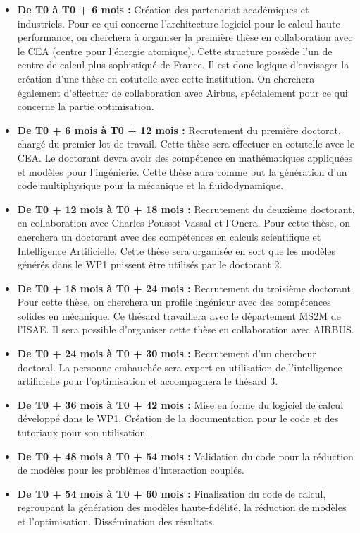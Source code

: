 \documentclass[12pt, french]{article}
\begin{document}
\begin{itemize}
	\item \textbf{De T0 à T0 + 6 mois :} Création des partenariat académiques et industriels.
	Pour ce qui concerne l'architecture logiciel pour le calcul haute performance, on cherchera à organiser la première thèse en collaboration avec le CEA (centre pour l'énergie atomique). Cette structure possède l'un de centre de calcul plus sophistiqué de France. Il est donc logique d'envisager la création d'une thèse en cotutelle avec cette institution. On cherchera également d'effectuer de collaboration avec Airbus, spécialement pour ce qui concerne la partie optimisation.
	\item \textbf{De T0 + 6 mois à T0 + 12 mois : } Recrutement du première doctorat, chargé du premier lot de travail. Cette thèse sera effectuer en cotutelle avec le CEA. Le doctorant devra avoir des compétence en mathématiques appliquées et modèles pour l'ingénierie. Cette thèse aura comme but la génération d'un code multiphysique pour la mécanique et la fluidodynamique.
	\item \textbf{De T0 + 12 mois à T0 + 18 mois : } Recrutement du deuxième doctorant, en collaboration avec Charles Poussot-Vassal et l'Onera. Pour cette thèse, on cherchera un doctorant avec des compétences en calculs scientifique et Intelligence Artificielle. Cette thèse sera organisée en sort que les modèles générés dans le WP1 puissent être utilisés par le doctorant 2.
	\item \textbf{De T0 + 18 mois à T0 + 24 mois : } Recrutement du troisième doctorant. Pour cette thèse, on cherchera un profile ingénieur avec des compétences solides en mécanique. Ce thésard travaillera avec le département MS2M de l'ISAE. Il sera possible d'organiser cette thèse en collaboration avec AIRBUS.
	\item \textbf{De T0 + 24 mois à T0 + 30 mois : } Recrutement d'un chercheur doctoral. La personne embauchée sera expert en utilisation de l'intelligence artificielle pour l'optimisation et accompagnera le thésard 3. 
	\item \textbf{De T0 + 36 mois à T0 + 42 mois : } Mise en forme du logiciel de calcul développé dans le WP1. Création de la documentation pour le code et des tutoriaux pour son utilisation.
	\item \textbf{De T0 + 48 mois à T0 + 54 mois : } Validation du code pour la réduction de modèles pour les problèmes d'interaction couplés.
	\item \textbf{De T0 + 54 mois à T0 + 60 mois : } Finalisation du code de calcul, regroupant la génération des modèles haute-fidélité, la réduction de modèles et l'optimisation. Dissémination des résultats.
\end{itemize} 
\end{document}
